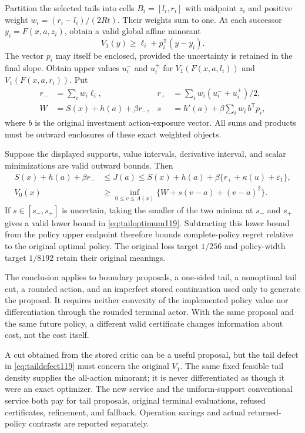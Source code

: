 Partition the selected tails into cells $B_i=[l_i,r_i]$ with midpoint
$z_i$ and positive weight $w_i=(r_i-l_i)/(2Rt)$.  Their weights sum to
one.  At each successor $y_i=F(x,a,z_i)$, obtain a valid global affine
minorant
\[
 V_1(y)\ge \ell_i+p_i^{\mathsf T}(y-y_i).
\]
The vector $p_i$ may itself be enclosed, provided the uncertainty is
retained in the final slope.  Obtain upper values $u_i^-$ and $u_i^+$
for $V_1(F(x,a,l_i))$ and $V_1(F(x,a,r_i))$.  Put
\begin{align}
 r_-&=\sum_i w_i\ell_i,&
 r_+&=\sum_i w_i(u_i^-+u_i^+)/2,\label{eq:tailquadrature119}\\
 W&=S(x)+h(a)+\beta r_-,&
 s&=h'(a)+\beta\sum_iw_i\,b^{\mathsf T}p_i,
 \label{eq:tailactionsupport119}
\end{align}
where $b$ is the original investment action-exposure vector.  All sums
and products must be outward enclosures of these exact weighted objects.

\begin{theorem}
\label{thm:investmenttail119}
Suppose the displayed supports, value intervals, derivative interval,
and scalar minimizations are valid outward bounds.  Then
\begin{align}
 S(x)+h(a)+\beta r_-
 &\le J(a)\le
 S(x)+h(a)+\beta\{r_++\kappa(u)+\varepsilon_1\},
 \label{eq:tailpolicyinterval119}\\
 V_0(x)&\ge
 \inf_{0\le v\le A(x)}\{W+s(v-a)+(v-a)^2\}.
 \label{eq:tailoptimum119}
\end{align}
If $s\in[s_-,s_+]$ is uncertain, taking the smaller of the two minima
at $s_-$ and $s_+$ gives a valid lower bound in
\eqref{eq:tailoptimum119}.  Subtracting this lower bound from the
policy upper endpoint therefore bounds complete-policy regret relative
to the original optimal policy.  The original loss target $1/256$ and
policy-width target $1/8192$ retain their original meanings.

The conclusion applies to boundary proposals, a one-sided tail, a
nonoptimal tail cut, a rounded action, and an imperfect stored
continuation used only to generate the proposal.  It requires neither
convexity of the implemented policy value nor differentiation through
the rounded terminal actor.  With the same proposal and the same future
policy, a different valid certificate changes information about cost,
not the cost itself.
\end{theorem}

A cut obtained from the stored critic can be a useful proposal, but the
tail defect in \eqref{eq:taildefect119} must concern the original $V_1$.
The same fixed feasible tail density supplies the all-action minorant;
it is never differentiated as though it were an exact optimizer.  The
new service and the uniform-support conventional service both pay for
tail proposals, original terminal evaluations, refused certificates,
refinement, and fallback.  Operation savings and actual returned-policy
contrasts are reported separately.

